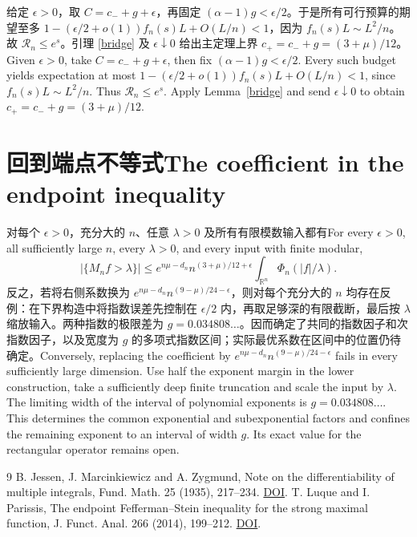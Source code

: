 \documentclass[UTF8,fontset=fandol,11pt]{ctexart}
\newcommand{\bi}[2]{\ifdefined\ResearchPaperChinese #1\else #2\fi}
\begin{document}

\bi{给定 $\epsilon>0$，取 $C=c_-+g+\epsilon$，再固定 $(\alpha-1)g<\epsilon/2$。于是所有可行预算的期望至多 $1-(\epsilon/2+o(1))f_n(s)L+O(L/n)<1$，因为 $f_n(s)L\sim L^2/n$。故 $\mathcal R_n\le e^s$。引理 \ref{bridge} 及 $\epsilon\downarrow0$ 给出主定理上界 $c_+=c_-+g=(3+\mu)/12$。}{Given $\epsilon>0$, take $C=c_-+g+\epsilon$, then fix $(\alpha-1)g<\epsilon/2$. Every such budget yields expectation at most $1-(\epsilon/2+o(1))f_n(s)L+O(L/n)<1$, since $f_n(s)L\sim L^2/n$. Thus $\mathcal R_n\le e^s$. Apply Lemma~\ref{bridge} and send $\epsilon\downarrow0$ to obtain $c_+=c_-+g=(3+\mu)/12$.}

\section{\bi{回到端点不等式}{The coefficient in the endpoint inequality}}
\bi{对每个 $\epsilon>0$，充分大的 $n$、任意 $\lambda>0$ 及所有有限模数输入都有}{For every $\epsilon>0$, all sufficiently large $n$, every $\lambda>0$, and every input with finite modular,}
\[
 |\{M_nf>\lambda\}|\le e^{n\mu-d_n}n^{(3+\mu)/12+\epsilon}
 \int_{\mathbb R^n}\Phi_n(|f|/\lambda).
\]
\bi{反之，若将右侧系数换为 $e^{n\mu-d_n}n^{(9-\mu)/24-\epsilon}$，则对每个充分大的 $n$ 均存在反例：在下界构造中将指数误差先控制在 $\epsilon/2$ 内，再取足够深的有限截断，最后按 $\lambda$ 缩放输入。两种指数的极限差为 $g=0.034808\ldots$。因而确定了共同的指数因子和次指数因子，以及宽度为 $g$ 的多项式指数区间；实际最优系数在区间中的位置仍待确定。}{Conversely, replacing the coefficient by $e^{n\mu-d_n}n^{(9-\mu)/24-\epsilon}$ fails in every sufficiently large dimension. Use half the exponent margin in the lower construction, take a sufficiently deep finite truncation and scale the input by $\lambda$. The limiting width of the interval of polynomial exponents is $g=0.034808\ldots$. This determines the common exponential and subexponential factors and confines the remaining exponent to an interval of width $g$. Its exact value for the rectangular operator remains open.}
\begin{thebibliography}{9}
 B. Jessen, J. Marcinkiewicz and A. Zygmund, Note on the differentiability of multiple integrals, Fund. Math. 25 (1935), 217--234. \href{https://doi.org/10.4064/fm-25-1-217-234}{DOI}.
 T. Luque and I. Parissis, The endpoint Fefferman--Stein inequality for the strong maximal function, J. Funct. Anal. 266 (2014), 199--212. \href{https://doi.org/10.1016/j.jfa.2013.09.028}{DOI}.
\end{thebibliography}
\end{document}

